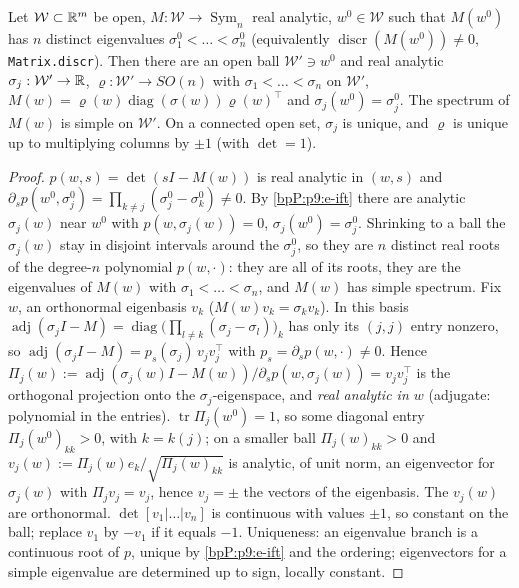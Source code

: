 \begin{proposition}\label{bpP:p9:local-analytic}
Let $\mathcal W\subset\mathbb{R}^m$ be open, $M:\mathcal W\to\operatorname{Sym}_n$ real analytic, $w^0\in\mathcal W$ such that $M(w^0)$ has $n$ distinct eigenvalues $\sigma_1^0<\dots<\sigma_n^0$ (equivalently $\operatorname{discr}(M(w^0))\ne0$, \texttt{Matrix.discr}). Then there are an open ball $\mathcal W'\ni w^0$ and real analytic $\sigma_j:\mathcal W'\to\mathbb{R}$, $\varrho:\mathcal W'\to SO(n)$ with $\sigma_1<\dots<\sigma_n$ on $\mathcal W'$, $M(w)=\varrho(w)\operatorname{diag}(\sigma(w))\varrho(w)^\top$ and $\sigma_j(w^0)=\sigma_j^0$. The spectrum of $M(w)$ is simple on $\mathcal W'$. On a connected open set, $\sigma_j$ is unique, and $\varrho$ is unique up to multiplying columns by $\pm1$ (with $\det=1$).
\end{proposition}
\begin{proof}
\label{stepP:p9:la-ev} $p(w,s)=\det(sI-M(w))$ is real analytic in $(w,s)$ and $\partial_sp(w^0,\sigma_j^0)=\prod_{k\ne j}(\sigma^0_j-\sigma^0_k)\ne0$. By \ref{bpP:p9:e-ift} there are analytic $\sigma_j(w)$ near $w^0$ with $p(w,\sigma_j(w))=0$, $\sigma_j(w^0)=\sigma_j^0$. Shrinking to a ball the $\sigma_j(w)$ stay in disjoint intervals around the $\sigma_j^0$, so they are $n$ distinct real roots of the degree-$n$ polynomial $p(w,\cdot)$: they are all of its roots, they are the eigenvalues of $M(w)$ with $\sigma_1<\dots<\sigma_n$, and $M(w)$ has simple spectrum.
\label{stepP:p9:la-adj} Fix $w$, an orthonormal eigenbasis $v_k$ ($M(w)v_k=\sigma_kv_k$). In this basis $\operatorname{adj}(\sigma_jI-M)=\operatorname{diag}\big(\prod_{l\ne k}(\sigma_j-\sigma_l)\big)_k$ has only its $(j,j)$ entry nonzero, so $\operatorname{adj}(\sigma_jI-M)=p_s(\sigma_j)\,v_jv_j^\top$ with $p_s=\partial_sp(w,\cdot)\ne0$. Hence $\Pi_j(w):=\operatorname{adj}(\sigma_j(w)I-M(w))/\partial_sp(w,\sigma_j(w))=v_jv_j^\top$ is the orthogonal projection onto the $\sigma_j$-eigenspace, and \emph{real analytic in $w$} (adjugate: polynomial in the entries).
\label{stepP:p9:la-vec} $\operatorname{tr}\Pi_j(w^0)=1$, so some diagonal entry $\Pi_j(w^0)_{kk}>0$, with $k=k(j)$; on a smaller ball $\Pi_j(w)_{kk}>0$ and $v_j(w):=\Pi_j(w)e_k/\sqrt{\Pi_j(w)_{kk}}$ is analytic, of unit norm, an eigenvector for $\sigma_j(w)$ with $\Pi_jv_j=v_j$, hence $v_j=\pm$ the vectors of the eigenbasis. The $v_j(w)$ are orthonormal.
\label{stepP:p9:la-so} $\det[v_1|\dots|v_n]$ is continuous with values $\pm1$, so constant on the ball; replace $v_1$ by $-v_1$ if it equals $-1$. Uniqueness: an eigenvalue branch is a continuous root of $p$, unique by \ref{bpP:p9:e-ift} and the ordering; eigenvectors for a simple eigenvalue are determined up to sign, locally constant.
\end{proof}

